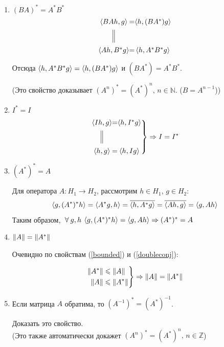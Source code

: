 \documentclass[12pt]{article}
\begin{document}
\begin{enumerate}
		\item $(BA)^{*} = A^{*}B^{*}$
		$$
		\begin{CD}
			\scal{BAh}{g} @. = @. \scal{h}{(BA^{*})g} \\
				@| \\
			\scal{Ah}{B^{*}g} @. = @. \scal{h}{A^{*}B^{*}g}
		\end{CD}
		$$
		
		Отсюда $\left\langle h, A^{*}B^{*}g \right\rangle = \left\langle h, (BA^{*})g \right\rangle$ и $(BA^{*}) = A^{*}B^{*}$.
		
		{\Large(}Это свойство доказывает $(A^n)^{*} = (A^{*})^n,\, n \in \mathbb{N}$. ($B=A^{n-1}$){\Large)} \\
		
		\item $I^{*} = I$
		$$
		\left.
		\begin{CD}
			\scal{Ih}{g} @. = @. \scal{h}{I^{*}g} \\
				@| \\
			\scal{h}{g} @. = @. \scal{h}{Ig}
		\end{CD}
		\right\} \Rightarrow I = I^{*}
		$$
		
		\item $(A^{*})^{*} = A$ \label{doubleconj}
		
		Для оператора $A: H_1 \rightarrow H_2$, рассмотрим $h \in H_1$, $g \in H_2$:
		$$
			\left\langle g, (A^{*})^{*}h \right\rangle = \left\langle A^{*}g, h \right\rangle = \overline{\left\langle h, A^{*}g \right\rangle} = 
			\overline{\left\langle Ah, g \right\rangle} = \left\langle g, Ah \right\rangle
		$$
		Таким образом, $\forall g,h \: \scal{g}{(A^{*})^{*}h} = \scal{g}{Ah} \Rightarrow (A^{*})^{*} = A$
		
		\item $\left\| A \right\| = \left\| A^{*} \right\|$
		
		Очевидно по свойствам (\ref{bounded}) и (\ref{doubleconj}):
		
		$$
		\left.
		\begin{aligned}
			\left\| A^{*} \right\| &\leqslant \left\| A \right\| \\
			\left\| A \right\| &\leqslant \left\| A^{*} \right\|
		\end{aligned}
		\right\}
		\Rightarrow \left\| A \right\| = \left\| A^{*} \right\|
		$$
		
		\item Если матрица $A$ обратима, то $(A^{-1})^{*} = (A^{*})^{-1}$.
		
		\exc Доказать это свойство. \\
		{\Large(}Это также автоматически докажет $(A^n)^{*} = (A^{*})^n,\, n \in \mathbb{Z}${\Large)}
	\end{enumerate}
	
\end{document}
